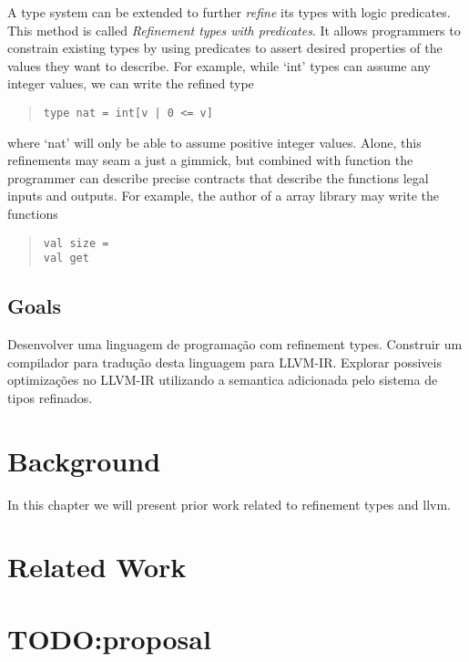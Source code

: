 \documentclass[
  english,
  lmodern,
  oneside
]{ufsc-thesis-rn46-2019/ufsc-thesis-rn46-2019}
\begin{document}
A type system can be extended to further \textit{refine} its types with logic predicates.
This method is called \textit{Refinement types with predicates}.
It allows programmers to constrain existing types by using predicates to assert desired properties of the values they want to describe.
For example, while `int' types can assume any integer values, we can write the refined type
\begin{quote}
\begin{verbatim}
type nat = int[v | 0 <= v]
\end{verbatim}
\end{quote}
where `nat' will only be able to assume positive integer values.
Alone, this refinements may seam a just a gimmick, but combined with function the programmer can describe precise contracts that describe the functions legal inputs and outputs.
For example, the author of a array library may write the functions
\begin{quote}
\begin{verbatim}
val size =
val get
\end{verbatim}
\end{quote}


\section{Goals}\label{chapter:introduction:sec:goals}

Desenvolver uma linguagem de programação com refinement types.
Construir um compilador para tradução desta linguagem para LLVM-IR.\@
Explorar possiveis optimizações no LLVM-IR utilizando a semantica adicionada pelo sistema de tipos refinados.

\chapter{Background}\label{chapter:background}

In this chapter we will present prior work related to refinement types and llvm.

\chapter{Related Work}\label{chapter:related_work}

\chapter{TODO:\@ proposal}

\postextual{}


\apendices{}
\end{document}
